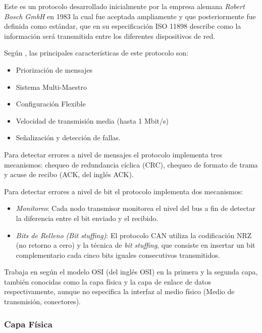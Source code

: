 Este es un protocolo desarrollado inicialmente por la empresa alemana 
\emph{Robert Bosch GmbH} en 1983 la cual fue aceptada ampliamente y que 
posteriormente fue definida como estándar, que en su especificación ISO 11898 
describe como la información será transmitida entre los diferentes dispositivos 
de red.

Seg\'un \cite{RBG1991}, las principales características de este protocolo son:

\begin{itemize}
	\item Priorización de mensajes
	\item Sistema Multi-Maestro
	\item Configuración Flexible
	\item Velocidad de transmisión media (hasta 1 Mbit/s)
	\item Señalización y detección de fallas.
\end{itemize}

Para  detectar  errores  a  nivel  de  mensajes  el  protocolo  implementa  tres  
mecanismos: chequeo de redundancia cíclica (\acrshort{CRC}), chequeo de formato 
de trama y acuse de recibo (\acrshort{ACK}, del ingl\'es \acrlong{ACK}).

Para detectar errores a nivel de bit el protocolo implementa dos mecanismos: 

\begin{itemize}
    \item \emph{Monitoreo}: Cada nodo transmisor monitorea el nivel del bus a fin 
        de detectar la diferencia entre el bit enviado y el recibido. 
    \item \emph{Bits de Relleno (Bit stuffing)}: El protocolo \acrshort{CAN} 
        utiliza la codificación NRZ (no retorno a cero) y la técnica de
        \emph{bit stuffing}, que consiste en insertar un bit complementario 
        cada cinco bits iguales consecutivos transmitidos. 
\end{itemize}

Trabaja en según el modelo \acrshort{OSI} (del ingl\'es \acrlong{OSI}) en la 
primera y la segunda capa, también conocidas como la capa física y la capa de 
enlace de datos respectivamente, aunque no especifica la interfaz al medio 
físico (Medio de transmisión, conectores). 

\subsubsection{Capa Física} 

